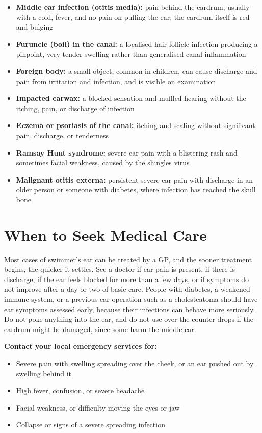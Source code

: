 \begin{itemize}
    \item \textbf{Middle ear infection (otitis media):} pain behind the eardrum, usually with a cold, fever, and no pain on pulling the ear; the eardrum itself is red and bulging
    \item \textbf{Furuncle (boil) in the canal:} a localised hair follicle infection producing a pinpoint, very tender swelling rather than generalised canal inflammation
    \item \textbf{Foreign body:} a small object, common in children, can cause discharge and pain from irritation and infection, and is visible on examination
    \item \textbf{Impacted earwax:} a blocked sensation and muffled hearing without the itching, pain, or discharge of infection
    \item \textbf{Eczema or psoriasis of the canal:} itching and scaling without significant pain, discharge, or tenderness
    \item \textbf{Ramsay Hunt syndrome:} severe ear pain with a blistering rash and sometimes facial weakness, caused by the shingles virus
    \item \textbf{Malignant otitis externa:} persistent severe ear pain with discharge in an older person or someone with diabetes, where infection has reached the skull bone
\end{itemize}

\section*{When to Seek Medical Care}
Most cases of swimmer's ear can be treated by a GP, and the sooner treatment begins, the quicker it settles. See a doctor if ear pain is present, if there is discharge, if the ear feels blocked for more than a few days, or if symptoms do not improve after a day or two of basic care. People with diabetes, a weakened immune system, or a previous ear operation such as a cholesteatoma should have ear symptoms assessed early, because their infections can behave more seriously. Do not poke anything into the ear, and do not use over-the-counter drops if the eardrum might be damaged, since some harm the middle ear.

\textbf{Contact your local emergency services for:}
\begin{itemize}
    \item Severe pain with swelling spreading over the cheek, or an ear pushed out by swelling behind it
    \item High fever, confusion, or severe headache
    \item Facial weakness, or difficulty moving the eyes or jaw
    \item Collapse or signs of a severe spreading infection
\end{itemize}

